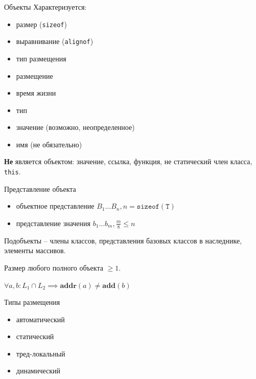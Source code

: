 \documentclass[unknownkeysallowed,xcolor=table]{beamer}
\begin{document}
\begin{frame}{Объекты}
  Характеризуется:
  \begin{itemize}
    \item размер (\lstinline{sizeof})
    \item выравнивание (\lstinline{alignof})
    \item тип размещения
    \item размещение
    \item время жизни
    \item тип
    \item значение (возможно, неопределенное)
    \item имя (не обязательно)
  \end{itemize}

  \vspace{1em}

  \textbf{Не} является объектом: значение, ссылка, функция, не статический член класса, \lstinline{this}.
\end{frame}

\begin{frame}{Представление объекта}
  \begin{itemize}
    \item объектное представление $B_1 \dotso B_n, n = \mathtt{sizeof(T)}$ \vspace{0.5em}
    \item представление значения $b_1 \dotso b_m, \frac{m}{8} \leq n$
  \end{itemize}

  \vspace{2em}

  Подобъекты -- члены классов, представления базовых классов в наследнике, элементы массивов.

  \vspace{2em}

  Размер любого полного объекта $\geq 1$.

  \vspace{2em}

  $\forall a, b: L_1 \cap L_2 \implies \mathbf{addr}(a) \neq \mathbf{add}(b)$
\end{frame}

\begin{frame}{Типы размещения}
  \begin{itemize}
    \item автоматический \vspace{1em}
    \item статический \vspace{1em}
    \item тред-локальный \vspace{1em}
    \item динамический
  \end{itemize}
\end{frame}
\end{document}

